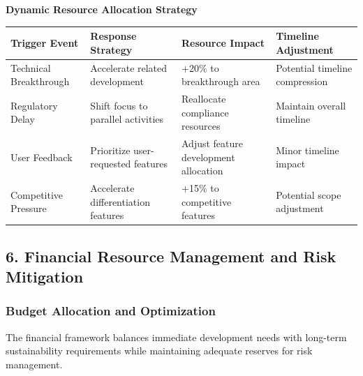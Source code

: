 \documentclass[
  letterpaper,
  DIV=11,
  numbers=noendperiod]{scrartcl}
\begin{document}
\textbf{Dynamic Resource Allocation Strategy}

\begin{longtable}[]{@{}
  >{\raggedright\arraybackslash}p{}
  >{\raggedright\arraybackslash}p{}
  >{\raggedright\arraybackslash}p{}
  >{\raggedright\arraybackslash}p{}@{}}
\toprule\noalign{}
\begin{minipage}[b]{\linewidth}\raggedright
Trigger Event
\end{minipage} & \begin{minipage}[b]{\linewidth}\raggedright
Response Strategy
\end{minipage} & \begin{minipage}[b]{\linewidth}\raggedright
Resource Impact
\end{minipage} & \begin{minipage}[b]{\linewidth}\raggedright
Timeline Adjustment
\end{minipage} \\
\midrule\noalign{}
\endhead
\bottomrule\noalign{}
\endlastfoot
Technical Breakthrough & Accelerate related development & +20\% to
breakthrough area & Potential timeline compression \\
Regulatory Delay & Shift focus to parallel activities & Reallocate
compliance resources & Maintain overall timeline \\
User Feedback & Prioritize user-requested features & Adjust feature
development allocation & Minor timeline impact \\
Competitive Pressure & Accelerate differentiation features & +15\% to
competitive features & Potential scope adjustment \\
\end{longtable}

\subsection{6. Financial Resource Management and Risk
Mitigation}\label{financial-resource-management-and-risk-mitigation}

\subsubsection{Budget Allocation and
Optimization}\label{budget-allocation-and-optimization}

The financial framework balances immediate development needs with
long-term sustainability requirements while maintaining adequate
reserves for risk management.
\end{document}
